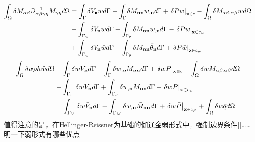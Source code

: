 \documentclass[a4paper]{article}
\begin{document}
\begin{equation}
    \begin{split}
        \int_\Omega {\delta {M_{\alpha \beta }}D_{\alpha \beta \gamma \eta }^{ - 1}{M_{\gamma \eta }}d\Omega }&=\int_\Gamma  {\delta {V_{\bf{n}}}wd\Gamma }  - \int_\Gamma  {\delta {M_{{\bf{nn}}}}{w_{,{\bf{n}}}}d\Gamma }+{\left. {\delta Pw} \right|_{{\bf{x}} \in c}} - \int_\Omega  {\delta {M_{\alpha \beta ,\alpha \beta }}wd\Omega } \\
        &-\int_{{\Gamma _w}} {\delta {V_{\bf{n}}}wd\Gamma }  + \int_{{\Gamma _\theta }} {\delta {M_{{\bf{nn}}}}{w_{,{\bf{n}}}}d\Gamma }  - {\left. {\delta Pw} \right|_{{\bf{x}} \in {c_w}}}\\
        &+\int_{{\Gamma _w}} {\delta {V_{\bf{n}}}\bar wd\Gamma }  - \int_{{\Gamma _\theta }} {\delta {M_{{\bf{nn}}}}{{\bar \theta }_{\bf{n}}}d\Gamma }  + {\left. {\delta P\bar w} \right|_{{\bf{x}} \in {c_w}}}
    \end{split}
\end{equation}
\begin{equation}
        \begin{split}
            \int_{\Omega}\delta w\rho h\ddot{w}d\Omega &+ \int_\Gamma  {\delta w{V_{\bf{n}}}d\Gamma } - \int_\Gamma  {\delta {w_{,{\bf{n}}}}{M_{{\bf{nn}}}}d\Gamma }  + {\left. {\delta wP} \right|_{{\bf{x}} \in c}} - \int_\Omega  {\delta w{M_{\alpha \beta ,\alpha\beta}}d\Omega }\\
            &- \int_{{\Gamma _w}} {\delta w{V_{\bf{n}}}d\Gamma }  + \int_{{\Gamma _\theta }} {\delta {w_{,{\bf{n}}}}{M_{{\bf{nn}}}}d\Gamma }  - {\left. {\delta wP} \right|_{{\bf{x}} \in {c_w}}}\\
            &= \int_{{\Gamma _V}} {\delta w{{\bar V}_{\bf{n}}}d\Gamma }  - \int_{{\Gamma _M}} {\delta {w_{,{\bf{n}}}}{{\bar M}_{{\bf{nn}}}}d\Gamma }  + {\left. {\delta w\bar P} \right|_{{\bf{x}} \in {c_P}}} + \int_\Omega  {\delta w\bar qd\Omega} 
    \end{split}
\end{equation}
    值得注意的是，在Hellinger-Reissner为基础的伽辽金弱形式中，强制边界条件[]……明一下弱形式有哪些优点
\end{document}

